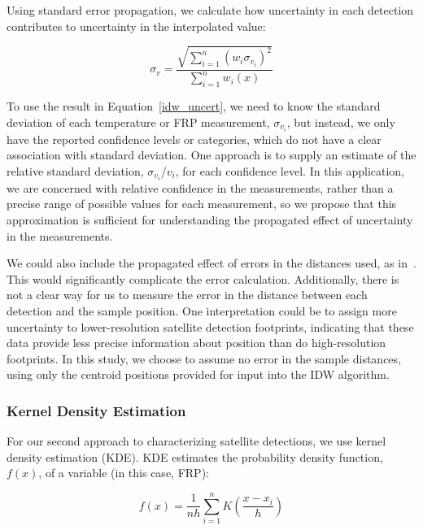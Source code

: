 Using standard error propagation, we calculate how uncertainty in each detection contributes to uncertainty in the interpolated value:

\begin{equation}
    \sigma_v = \frac{\sqrt{\sum_{i=1}^{n}(w_i
    \sigma_{v_i})^2}}{\sum_{i=1}^{n}w_i(x)}
    \label{idw_uncert}
\end{equation}

To use the result in Equation~\ref{idw_uncert}, we need to know the standard deviation of each temperature or FRP measurement, $\sigma_{v_i}$, but instead, we only have the reported confidence levels or categories, which do not have a clear association with standard deviation. One approach is to supply an estimate of the relative standard deviation, $\sigma_{v_i}/v_i$, for each confidence level. In this application, we are concerned with relative confidence in the measurements, rather than a precise  range of possible values for each measurement, so we propose that this approximation is sufficient for understanding the propagated effect of uncertainty in the measurements.

We could also include the propagated effect of errors in the distances used, as in~\cite{doi:10.1080/10106040801966704}. This would significantly complicate the error calculation. Additionally, there is not a clear way for us to measure the error in the distance between each detection and the sample position. One interpretation could be to assign more uncertainty to lower-resolution satellite detection footprints, indicating that these data provide less precise information about position than do high-resolution footprints. In this study, we choose to assume no error in the sample distances, using only the centroid positions provided for input into the IDW algorithm.


\subsubsection{Kernel Density Estimation}
For our second approach to characterizing satellite detections, we use kernel density estimation (KDE). KDE estimates the probability density function, $f(x)$, of a variable (in this case, FRP):

\begin{equation}
f(x) = \frac{1}{nh}\sum_{i=1}^{n}K(\frac{x-x_i}{h})
\end{equation}

